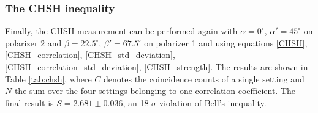 \documentclass[a4paper,
DIV=13,
12pt,
BCOR=10mm,
department=FakEI,
twoside,
parskip=half,
automark,
logostyle=flat,
]{OTHRartcl}
\begin{document}
\subsubsection{The CHSH inequality}


Finally, the CHSH measurement can be performed again with $\alpha = 0^\circ$, $\alpha' = 45^\circ$ on polarizer 2 and $\beta = 22.5^\circ$, $\beta' = 67.5^\circ$ on polarizer 1 and using equations \eqref{CHSH}, \eqref{CHSH_correlation}, \eqref{CHSH_std_deviation}, \eqref{CHSH_correlation_std_deviation}, \eqref{CHSH_strength}. The results are shown in Table \ref{tab:chsh}, where $C$ denotes the coincidence counts of a single setting and $N$ the sum over the four settings belonging to one correlation coefficient. The final result is $S = 2.681 \pm 0.036$, an 18-$\sigma$ violation of Bell's inequality.
\end{document}
